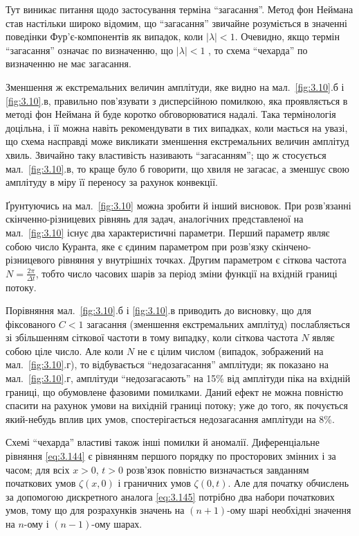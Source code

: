 \begin{remark}
    Тут виникає питання щодо застосування терміна ``загасання''. Метод фон Неймана став настільки широко відомим, що ``загасання'' звичайне розуміється в значенні поведінки Фур'є-компонентів як випадок, коли $|\lambda| < 1$. Очевидно, якщо термін ``загасання'' означає по визначенню, що $|\lambda| < 1$ , то схема ``чехарда'' по визначенню не має загасання.
\end{remark}

Зменшення ж екстремальних величин амплітуди, яке видно на мал.~\ref{fig:3.10}.б і \ref{fig:3.10}.в, правильно пов'язувати з дисперсійною помилкою, яка проявляється в методі фон Неймана й буде коротко обговорюватися надалі. Така термінологія доцільна, і її можна навіть рекомендувати в тих випадках, коли мається на увазі, що схема насправді може викликати зменшення екстремальних величин амплітуд хвиль. Звичайно таку властивість називають ``загасанням''; що ж стосується мал.~\ref{fig:3.10}.в, то краще було б говорити, що хвиля не загасає, а зменшує свою амплітуду в міру її переносу за рахунок конвекції. \medskip

Ґрунтуючись на мал.~\ref{fig:3.10} можна зробити й інший висновок. При розв'язанні скін\-чен\-но-різ\-ни\-це\-вих рівнянь для задач, аналогічних представленої на мал.~\ref{fig:3.10} існує два характеристичні параметри. Перший параметр являє собою число Куранта, яке є єдиним параметром при розв'язку скінчено-різницевого рівняння у внутрішніх точках. Другим параметром є сіткова частота$N = \frac{2 \pi}{\Delta t}$, тобто число часових шарів за період зміни функції на вхідній границі потоку. \medskip

Порівняння мал.~\ref{fig:3.10}.б і \ref{fig:3.10}.в приводить до висновку, що для фіксованого $C < 1$ загасання (зменшення екстремальних амплітуд) послабляється зі збільшенням сіткової частоти в тому випадку, коли сіткова частота $N$ являє собою ціле число. Але коли $N$ не є цілим числом (випадок, зображений на мал.~\ref{fig:3.10}.г), то відбувається ``недозагасання'' амплітуди; як показано на мал.~\ref{fig:3.10}.г, амплітуди ``недозагасають'' на 15\% від амплітуди піка на вхідній границі, що обумовлене фазовими помилками. Даний ефект не можна повністю спасити на рахунок умови на вихідній границі потоку; уже до того, як почується який-небудь вплив цих умов, спостерігається недозагасання амплітуди на 8\%. \medskip

Схемі ``чехарда'' властиві також інші помилки й аномалії. Диференціальне рівняння \eqref{eq:3.144} є рівнянням першого порядку по просторових змінних і за часом; для всіх $x > 0$, $t > 0$ розв'язок повністю визначається завданням початкових умов $\zeta(x, 0)$ і граничних умов $\zeta(0, t)$. Але для початку обчислень за допомогою дискретного аналога \eqref{eq:3.145} потрібно два набори початкових умов, тому що для розрахунків значень на $(n+1)$-ому шарі необхідні значення на $n$-ому і $(n-1)$-ому шарах. \medskip


